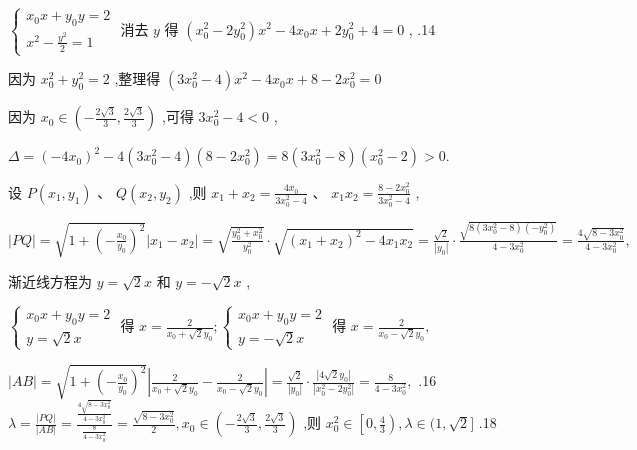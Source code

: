 \documentclass[10pt]{article}
\begin{document}
\(\left\{  \begin{array}{l} {x}_{0}x + {y}_{0}y = 2 \\  {x}^{2} - \frac{{y}^{2}}{2} = 1 \end{array}\right.\) 消去 \(y\) 得 \(\left( {{x}_{0}^{2} - 2{y}_{0}^{2}}\right) {x}^{2} - 4{x}_{0}x + 2{y}_{0}^{2} + 4 = 0\) , .14

因为 \({x}_{0}^{2} + {y}_{0}^{2} = 2\) ,整理得 \(\left( {3{x}_{0}^{2} - 4}\right) {x}^{2} - 4{x}_{0}x + 8 - 2{x}_{0}^{2} = 0\)

因为 \({x}_{0} \in  \left( {-\frac{2\sqrt{3}}{3},\frac{2\sqrt{3}}{3}}\right)\) ,可得 \(3{x}_{0}^{2} - 4 < 0\) ,

\(\Delta  = {\left( -4{x}_{0}\right) }^{2} - 4\left( {3{x}_{0}^{2} - 4}\right) \left( {8 - 2{x}_{0}^{2}}\right)  = 8\left( {3{x}_{0}^{2} - 8}\right) \left( {{x}_{0}^{2} - 2}\right)  > 0.\)

设 \(P\left( {{x}_{1},{y}_{1}}\right) \text{ 、 }Q\left( {{x}_{2},{y}_{2}}\right)\) ,则 \({x}_{1} + {x}_{2} = \frac{4{x}_{0}}{3{x}_{0}^{2} - 4}\text{ 、 }{x}_{1}{x}_{2} = \frac{8 - 2{x}_{0}^{2}}{3{x}_{0}^{2} - 4}\) ,

\(\left| {PQ}\right|  = \sqrt{1 + {\left( -\frac{{x}_{0}}{{y}_{0}}\right) }^{2}}\left| {{x}_{1} - {x}_{2}}\right|  = \sqrt{\frac{{y}_{0}^{2} + {x}_{0}^{2}}{{y}_{0}^{2}}} \cdot  \sqrt{{\left( {x}_{1} + {x}_{2}\right) }^{2} - 4{x}_{1}{x}_{2}} = \frac{\sqrt{2}}{\left| {y}_{0}\right| } \cdot  \frac{\sqrt{8\left( {3{x}_{0}^{2} - 8}\right) \left( {-{y}_{0}^{2}}\right) }}{4 - 3{x}_{0}^{2}} = \frac{4\sqrt{8 - 3{x}_{0}^{2}}}{4 - 3{x}_{0}^{2}},\)

渐近线方程为 \(y = \sqrt{2}x\) 和 \(y =  - \sqrt{2}x\) ,

\(\left\{  {\begin{array}{l} {x}_{0}x + {y}_{0}y = 2 \\  y = \sqrt{2}x \end{array}\text{ 得 }x = \frac{2}{{x}_{0} + \sqrt{2}{y}_{0}};\left\{  {\begin{array}{l} {x}_{0}x + {y}_{0}y = 2 \\  y =  - \sqrt{2}x \end{array}\text{ 得 }x = \frac{2}{{x}_{0} - \sqrt{2}{y}_{0}},}\right. }\right.\)

\(\left| {AB}\right|  = \sqrt{1 + {\left( -\frac{{x}_{0}}{{y}_{0}}\right) }^{2}}\left| {\frac{2}{{x}_{0} + \sqrt{2}{y}_{0}} - \frac{2}{{x}_{0} - \sqrt{2}{y}_{0}}}\right|  = \frac{\sqrt{2}}{\left| {y}_{0}\right| } \cdot  \frac{\left| 4\sqrt{2}{y}_{0}\right| }{\left| {x}_{0}^{2} - 2{y}_{0}^{2}\right| } = \frac{8}{4 - 3{x}_{0}^{2}},\) .16 \(\lambda  = \frac{\left| PQ\right| }{\left| AB\right| } = \frac{\frac{4\sqrt{8 - 3{x}_{0}^{2}}}{4 - 3{x}_{0}^{2}}}{\frac{8}{4 - 3{x}_{0}^{2}}} = \frac{\sqrt{8 - 3{x}_{0}^{2}}}{2},{x}_{0} \in  \left( {-\frac{2\sqrt{3}}{3},\frac{2\sqrt{3}}{3}}\right)\) ,则 \({x}_{0}^{2} \in  \left\lbrack  {0,\frac{4}{3}}\right) ,\lambda  \in  (1,\sqrt{2}\rbrack\) .18
\end{document}

